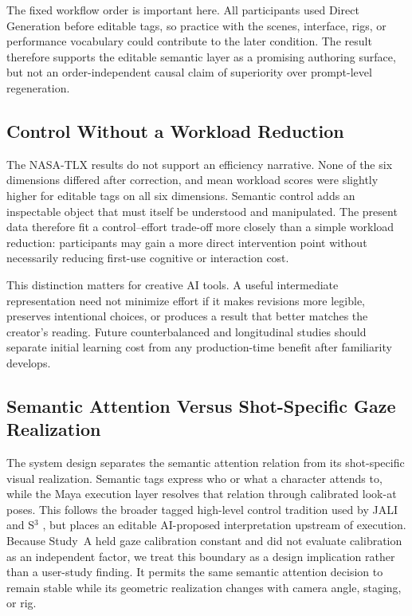 The fixed workflow order is important here. All participants used Direct Generation before editable tags, so practice with the scenes, interface, rigs, or performance vocabulary could contribute to the later condition. The result therefore supports the editable semantic layer as a promising authoring surface, but not an order-independent causal claim of superiority over prompt-level regeneration.

\subsection{Control Without a Workload Reduction}

The NASA-TLX results do not support an efficiency narrative. None of the six dimensions differed after correction, and mean workload scores were slightly higher for editable tags on all six dimensions. Semantic control adds an inspectable object that must itself be understood and manipulated. The present data therefore fit a control--effort trade-off more closely than a simple workload reduction: participants may gain a more direct intervention point without necessarily reducing first-use cognitive or interaction cost.

This distinction matters for creative AI tools. A useful intermediate representation need not minimize effort if it makes revisions more legible, preserves intentional choices, or produces a result that better matches the creator's reading. Future counterbalanced and longitudinal studies should separate initial learning cost from any production-time benefit after familiarity develops.

\subsection{Semantic Attention Versus Shot-Specific Gaze Realization}

The system design separates the semantic attention relation from its shot-specific visual realization. Semantic tags express who or what a character attends to, while the Maya execution layer resolves that relation through calibrated look-at poses. This follows the broader tagged high-level control tradition used by JALI and S$^3$ \cite{edwards2020jali,pan2024s3}, but places an editable AI-proposed interpretation upstream of execution. Because Study~A held gaze calibration constant and did not evaluate calibration as an independent factor, we treat this boundary as a design implication rather than a user-study finding. It permits the same semantic attention decision to remain stable while its geometric realization changes with camera angle, staging, or rig.

